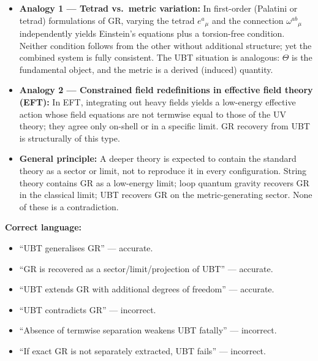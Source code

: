 \documentclass[12pt]{article}
\theoremstyle{definition}
\theoremstyle{remark}
\begin{document}
\begin{itemize}
  \item \textbf{Analogy 1 — Tetrad vs.\ metric variation:} In first-order
    (Palatini or tetrad) formulations of GR, varying the tetrad $e^a{}_\mu$
    and the connection $\omega^{ab}{}_\mu$ independently yields Einstein's
    equations plus a torsion-free condition.  Neither condition follows from
    the other without additional structure; yet the combined system is fully
    consistent.  The UBT situation is analogous: $\Theta$ is the fundamental
    object, and the metric is a derived (induced) quantity.

  \item \textbf{Analogy 2 — Constrained field redefinitions in effective field
    theory (EFT):} In EFT, integrating out heavy fields yields a low-energy
    effective action whose field equations are not termwise equal to those of
    the UV theory; they agree only on-shell or in a specific limit.  GR
    recovery from UBT is structurally of this type.

  \item \textbf{General principle:} A deeper theory is expected to contain
    the standard theory as a sector or limit, not to reproduce it in every
    configuration.  String theory contains GR as a low-energy limit;
    loop quantum gravity recovers GR in the classical limit; UBT recovers
    GR on the metric-generating sector.  None of these is a contradiction.
\end{itemize}

\bigskip
\noindent
\textbf{Correct language:}
\begin{itemize}
  \item[\checkmark] ``UBT generalises GR'' — accurate.
  \item[\checkmark] ``GR is recovered as a sector/limit/projection of UBT'' — accurate.
  \item[\checkmark] ``UBT extends GR with additional degrees of freedom'' — accurate.
  \item[$\times$] ``UBT contradicts GR'' — incorrect.
  \item[$\times$] ``Absence of termwise separation weakens UBT fatally'' — incorrect.
  \item[$\times$] ``If exact GR is not separately extracted, UBT fails'' — incorrect.
\end{itemize}


\ifdefined\INCLUDEMODE
\else
  
\end{document}
